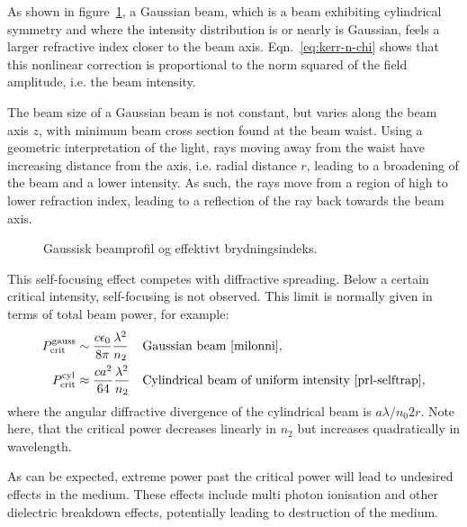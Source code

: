 As shown in figure~\ref{fig:kerr-refrac}, a Gaussian beam, which is a
beam exhibiting cylindrical symmetry and where the intensity
distribution is or nearly is Gaussian, feels a larger refractive index
closer to the beam axis. Eqn.~\eqref{eq:kerr-n-chi} shows that this
nonlinear correction is proportional to the norm squared of the field
amplitude, i.e. the beam intensity.

The beam size of a Gaussian beam is not constant, but varies along
the beam axis $z$, with minimum beam cross section found at the beam
waist. Using a geometric interpretation of the light, rays moving away
from the waist have increasing distance from the axis, i.e. radial
distance $r$, leading to a broadening of the beam and a lower
intensity. As such, the rays move from a region of high to lower
refraction index, leading to a reflection of the ray back towards the
beam axis.

\begin{figure}[t!]
  \centering
  \caption{Gaussisk beamprofil og effektivt brydningsindeks.}
  \label{fig:kerr-refrac}
\end{figure}

This self-focusing effect competes with diffractive spreading.
Below a certain critical intensity, self-focusing is not observed. This limit
is normally given in terms of total beam power, for example:
\begin{align}
  \label{eq:1}
  P_{\textup{crit}}^{\textup{gauss}}
  &\sim \frac{c \epsilon_0}{8 \pi} \frac{\lambda^2}{n_2}
  &&\text{Gaussian beam \cite{milonni}},
  \\
  P_{\textup{crit}}^{\textup{cyl}}
  &\approx \frac{c a^2}{64} \frac{\lambda^2}{n_2}
  &&\text{Cylindrical beam of uniform intensity \cite{prl-selftrap}},
\end{align}
where the angular diffractive divergence of the cylindrical beam is $a
\lambda / n_0 2 r$. Note here, that the critical power decreases
linearly in $n_2$ but increases quadratically in wavelength.

As can be expected, extreme power past the critical power will lead to
undesired effects in the medium. These effects include multi photon
ionisation and other dielectric breakdown effects, potentially leading
to destruction of the medium.

